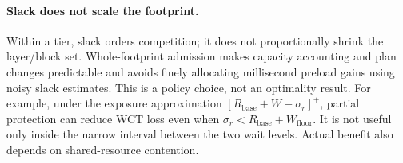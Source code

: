 \paragraph{Slack does not scale the footprint.}
Within a tier, slack orders competition; it does not proportionally shrink
the layer/block set. Whole-footprint admission makes capacity accounting
and plan changes predictable and avoids finely allocating millisecond
preload gains using noisy slack estimates. This is a policy choice, not
an optimality result. For example, under the exposure approximation
$[R_{\mathrm{base}}+W-\sigma_r]^+$, partial protection can reduce WCT loss
even when $\sigma_r<R_{\mathrm{base}}+W_{\mathrm{floor}}$.
It is not useful only inside the narrow interval between the two wait
levels. Actual benefit also depends on shared-resource contention.
